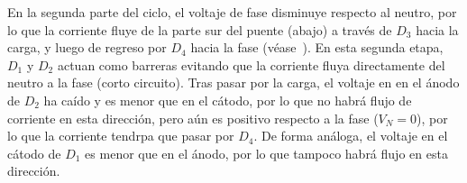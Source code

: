 En la segunda parte del ciclo, el voltaje de fase disminuye respecto al neutro, por lo que la corriente fluye de la parte sur del puente (abajo) a través de $D_3$ hacia la carga, y luego de regreso por $D_4$ hacia la fase (véase~).
En esta segunda etapa, $D_1$ y $D_2$ actuan como barreras evitando que la corriente fluya directamente del neutro a la fase (corto circuito).
Tras pasar por la carga, el voltaje en en el ánodo de $D_2$ ha caído y es menor que en el cátodo, por lo que no habrá flujo de corriente en esta dirección, pero aún es positivo respecto a la fase ($V_{N}=0$), por lo que la corriente tendrpa que pasar por $D_4$.
De forma análoga, el voltaje en el cátodo de $D_1$ es menor que en el ánodo, por lo que tampoco habrá flujo en esta dirección.
